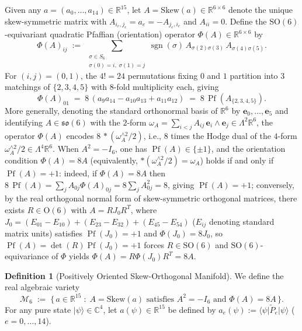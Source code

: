 \documentclass[11pt,a4paper]{article}
\theoremstyle{plain}
\theoremstyle{definition}
\newtheorem{definition}[theorem]{Definition}
\theoremstyle{remark}
\newcommand{\C}{\mathbb{C}}
\newcommand{\R}{\mathbb{R}}
\newcommand{\ket}[1]{\lvert #1 \rangle}
\newcommand{\expval}[2]{\langle #1 \vert #2 \vert #1 \rangle}
\newcommand{\Pf}{\operatorname{Pf}}
\newcommand{\sgn}{\operatorname{sgn}}
\newcommand{\SO}{\mathrm{SO}}
\newcommand{\Mman}{\mathcal{M}_6}
\begin{document}
Given any $a = (a_0, \dots, a_{14}) \in \R^{15}$, let $A = \mathrm{Skew}(a) \in \R^{6\times 6}$ denote the unique skew-symmetric matrix with $A_{i_e, j_e} = a_e = -A_{j_e, i_e}$ and $A_{ii} = 0$. Define the $\SO(6)$-equivariant quadratic Pfaffian (orientation) operator $\Phi(A) \in \R^{6\times 6}$ by
\begin{equation}
  \label{eq:hodge-phi}
  \Phi(A)_{ij} \;:=\; \sum_{\substack{\sigma \in S_6 \\ \sigma(0) = i,\; \sigma(1) = j}} \sgn(\sigma)\, A_{\sigma(2)\sigma(3)}\, A_{\sigma(4)\sigma(5)}.
\end{equation}
For $(i,j) = (0,1)$, the $4! = 24$ permutations fixing $0$ and $1$ partition into $3$ matchings of $\{2,3,4,5\}$ with $8$-fold multiplicity each, giving
\begin{equation}
  \label{eq:hodge-01}
  \Phi(A)_{01} \;=\; 8\,(a_9 a_{14} - a_{10} a_{13} + a_{11} a_{12})
  \;=\; 8\,\Pf(A_{\{2,3,4,5\}}).
\end{equation}
More generally, denoting the standard orthonormal basis of $\R^6$ by $\mathbf{e}_0, \dots, \mathbf{e}_5$ and identifying $A \in \mathfrak{so}(6)$ with the $2$-form $\omega_A = \sum_{i<j} A_{ij}\, \mathbf{e}_i \wedge \mathbf{e}_j \in \Lambda^2\R^6$, the operator $\Phi(A)$ encodes $8\,*(\omega_A^{\wedge 2}/2)$, i.e., $8$ times the Hodge dual of the $4$-form $\omega_A^{\wedge 2}/2 \in \Lambda^4\R^6$. When $A^2 = -I_6$, one has $\Pf(A) \in \{\pm 1\}$, and the orientation condition $\Phi(A) = 8A$ (equivalently, $*(\omega_A^{\wedge 2}/2) = \omega_A$) holds if and only if $\Pf(A) = +1$: indeed, if $\Phi(A) = 8A$ then $8\,\Pf(A) = \sum_{j} A_{0j}\Phi(A)_{0j} = 8\sum_j A_{0j}^2 = 8$, giving $\Pf(A) = +1$; conversely, by the real orthogonal normal form of skew-symmetric orthogonal matrices, there exists $R \in \mathrm{O}(6)$ with $A = R J_0 R^T$, where $J_0 = (E_{01}-E_{10}) + (E_{23}-E_{32}) + (E_{45}-E_{54})$ ($E_{ij}$ denoting standard matrix units) satisfies $\Pf(J_0) = +1$ and $\Phi(J_0) = 8J_0$, so $\Pf(A) = \det(R)\Pf(J_0) = +1$ forces $R \in \SO(6)$ and $\SO(6)$-equivariance of $\Phi$ yields $\Phi(A) = R\Phi(J_0)R^T = 8A$.

\begin{definition}[Positively Oriented Skew-Orthogonal Manifold]
\label{def:m6}
We define the real algebraic variety
\begin{equation}
  \label{eq:m6-def}
  \Mman \;:=\; \bigl\{\, a \in \R^{15} \;:\; A = \mathrm{Skew}(a) \text{ satisfies } A^2 = -I_6 \text{ and } \Phi(A) = 8A \,\bigr\}.
\end{equation}
For any pure state $\ket{\psi} \in \C^4$, let $a(\psi) \in \R^{15}$ be defined by $a_e(\psi) := \expval{\psi}{\tilde{P}_e}$ ($e = 0,\dots,14$).
\end{definition}
\end{document}
